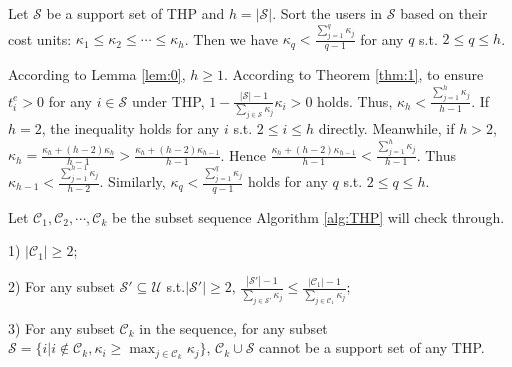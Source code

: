 \documentclass{IEEEtran}
\begin{document}

\begin{lemma}
\label{lem:2}
Let $\mathcal{S}$ be a support set of THP and $h=|\mathcal{S}|$. Sort the users in $\mathcal{S}$ based on their cost units: $\kappa_1 \leq \kappa_2 \leq \cdots \leq \kappa_h$. Then we have $\kappa_q<\frac{\sum_{j=1}^q\kappa_j}{q-1}$ for any $q$ s.t. $2\leq q\leq h$.
\end{lemma}
\begin{IEEEproof}
According to Lemma \ref{lem:0}, $h\geq 1$. According to Theorem \ref{thm:1}, to ensure $t_i^{e}>0$ for any $i\in\mathcal{S}$ under THP, $1-\frac{|\mathcal{S}|-1}{\sum_{j\in\mathcal{S}}\kappa_j}\kappa_i>0$ holds. Thus, $\kappa_h<\frac{\sum_{j=1}^h\kappa_j}{h-1}$. If $h=2$, the inequality holds for any $i$ s.t. $2\leq i\leq h$ directly. Meanwhile, if $h>2$, $\kappa_h=\frac{\kappa_h+(h-2)\kappa_h}{h-1}>\frac{\kappa_h+(h-2)\kappa_{h-1}}{h-1}$. Hence $\frac{\kappa_h+(h-2)\kappa_{h-1}}{h-1}<\frac{\sum_{j=1}^h\kappa_j}{h-1}$. Thus $\kappa_{h-1}<\frac{\sum_{j=1}^{h-1}\kappa_j}{h-2}$. Similarly, $\kappa_{q}<\frac{\sum_{j=1}^q\kappa_j}{q-1}$ holds for any $q$ s.t. $2\leq q\leq h$.
\end{IEEEproof}

\begin{lemma}
\label{lem:3}
Let $\mathcal{C}_1,\mathcal{C}_2,\cdots,\mathcal{C}_k$ be the subset sequence Algorithm \ref{alg:THP} will check through.\par{}
1) $|\mathcal{C}_1|\geq 2$;\par{}
2) For any subset $\mathcal{S}'\subseteq\mathcal{U}$ s.t.$|\mathcal{S}'|\geq 2$, $\frac{|\mathcal{S}'|-1}{\sum_{j\in\mathcal{S}'}\kappa_j}\leq\frac{|\mathcal{C}_1|-1}{\sum_{j\in\mathcal{C}_1}\kappa_j}$;\par{}
3) For any subset $\mathcal{C}_k$ in the sequence, for any subset $\mathcal{S}=\{i|i\notin\mathcal{C}_k,\kappa_i\geq\max_{j\in\mathcal{C}_k}\kappa_j\}$, $\mathcal{C}_k\cup\mathcal{S}$ cannot be a support set of any THP.
\end{lemma}
\end{document}
